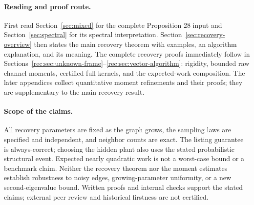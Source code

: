 \paragraph{Reading and proof route.}
First read Section~\ref{sec:mixed} for the complete Proposition 28 input
and Section~\ref{sec:spectral} for its spectral interpretation.
Section~\ref{sec:recovery-overview} then states the main recovery theorem
with examples, an algorithm explanation, and its meaning.
The complete recovery proofs immediately follow in
Sections~\ref{rec:sec:unknown-frame}--\ref{rec:sec:vector-algorithm}:
rigidity, bounded raw channel moments, certified full kernels, and the
expected-work composition. The later appendices collect quantitative
moment refinements and their proofs; they are supplementary to the main
recovery result.

\paragraph{Scope of the claims.}
All recovery parameters are fixed as the graph grows, the sampling laws
are specified and independent, and neighbor counts are exact. The
listing guarantee is always-correct; choosing the hidden plant also uses
the stated probabilistic structural event. Expected nearly quadratic
work is not a worst-case bound or a benchmark claim. Neither the
recovery theorem nor the moment estimates establish robustness to noisy
edges, growing-parameter uniformity, or a new second-eigenvalue bound.
Written proofs and internal checks support the stated claims; external
peer review and historical firstness are not certified.
